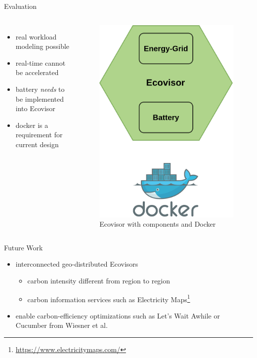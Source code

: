 \begin{frame}{Evaluation}
    \begin{columns}
        \begin{itemize}
            \item real workload modeling possible
            \item real-time cannot be accelerated
            \item battery \emph{needs} to be implemented into Ecovisor
            \item docker is a requirement for current design
        \end{itemize}
        \begin{figure}
        \centering
        \includegraphics[width=.5\textwidth]{../../evaluation}
        \caption{Ecovisor with components and Docker}
        \label{fig:}
        \end{figure}
    \end{columns}
\end{frame}

\begin{frame}{Future Work}
    \begin{itemize}
        \item interconnected geo-distributed Ecovisors
            \begin{itemize}
                \item carbon intensity different from region to region
                \item carbon information services such as Electricity
                    Maps\footnote{\url{https://www.electricitymaps.com/}\vspace{1cm}}
            \end{itemize}
    \end{itemize}
    \begin{itemize}
        \item[\arrow] enable carbon-efficiency optimizations such as
            Let's Wait Awhile or Cucumber from Wiesner et al. \cite{wiesner2021,
            wiesner2022}
    \end{itemize}
\end{frame}
